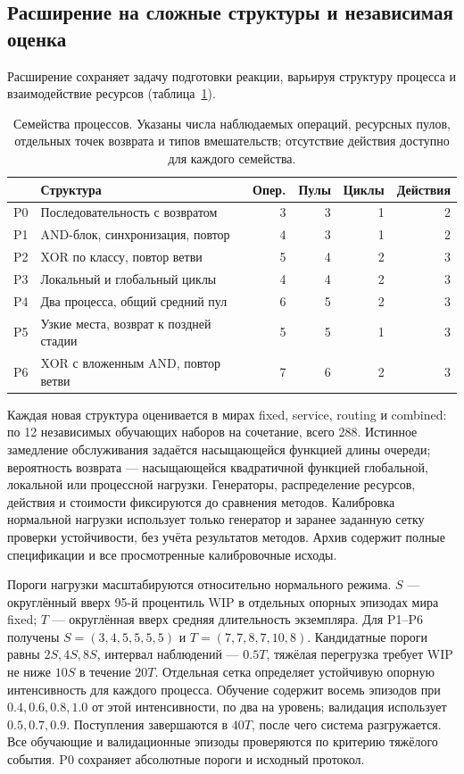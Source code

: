 \subsection{Расширение на сложные структуры и независимая оценка}
Расширение сохраняет задачу подготовки реакции, варьируя структуру процесса и взаимодействие ресурсов (таблица~\ref{tab:processes}).

\begin{table}[t]\caption{Семейства процессов. Указаны числа наблюдаемых операций, ресурсных пулов, отдельных точек возврата и типов вмешательств; отсутствие действия доступно для каждого семейства.}\label{tab:processes}\centering\small\setlength{\tabcolsep}{4pt}
\begin{tabular}{lp{}rrrr}\toprule
 & Структура & Опер. & Пулы & Циклы & Действия\\\midrule
P0 & Последовательность с возвратом & 3 & 3 & 1 & 2\\
P1 & AND-блок, синхронизация, повтор & 4 & 3 & 1 & 2\\
P2 & XOR по классу, повтор ветви & 5 & 4 & 2 & 3\\
P3 & Локальный и глобальный циклы & 4 & 4 & 2 & 3\\
P4 & Два процесса, общий средний пул & 6 & 5 & 2 & 3\\
P5 & Узкие места, возврат к поздней стадии & 5 & 5 & 1 & 3\\
P6 & XOR с вложенным AND, повтор ветви & 7 & 6 & 2 & 3\\
\bottomrule\end{tabular}\end{table}

Каждая новая структура оценивается в мирах fixed, service, routing и combined: по 12 независимых обучающих наборов на сочетание, всего 288. Истинное замедление обслуживания задаётся насыщающейся функцией длины очереди; вероятность возврата — насыщающейся квадратичной функцией глобальной, локальной или процессной нагрузки. Генераторы, распределение ресурсов, действия и стоимости фиксируются до сравнения методов. Калибровка нормальной нагрузки использует только генератор и заранее заданную сетку проверки устойчивости, без учёта результатов методов. Архив содержит полные спецификации и все просмотренные калибровочные исходы.

Пороги нагрузки масштабируются относительно нормального режима. $S$ — округлённый вверх 95-й процентиль WIP в отдельных опорных эпизодах мира fixed; $T$ — округлённая вверх средняя длительность экземпляра. Для P1--P6 получены $S=(3,4,5,5,5,5)$ и $T=(7,7,8,7,10,8)$. Кандидатные пороги равны $2S,4S,8S$, интервал наблюдений — $0.5T$, тяжёлая перегрузка требует WIP не ниже $10S$ в течение $20T$. Отдельная сетка определяет устойчивую опорную интенсивность для каждого процесса. Обучение содержит восемь эпизодов при $0.4,0.6,0.8,1.0$ от этой интенсивности, по два на уровень; валидация использует $0.5,0.7,0.9$. Поступления завершаются в $40T$, после чего система разгружается. Все обучающие и валидационные эпизоды проверяются по критерию тяжёлого события. P0 сохраняет абсолютные пороги и исходный протокол.

